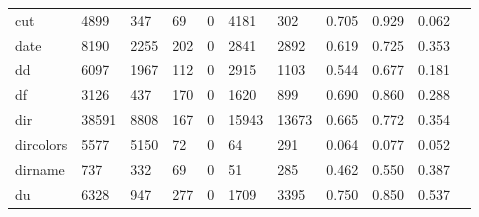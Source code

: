 \begin{longtable}{lp{1.10cm}p{1.10cm}p{1.10cm}p{1.10cm}p{1.10cm}p{1.10cm}p{1.10cm}p{1.10cm}p{1.10cm}p{1.10cm}}
cut       &                   4899 &                                347 &                                69 &                                0 &                              4181 &                             302 &                          0.705 &                                 0.929 &                               0.062 \\
date      &                   8190 &                               2255 &                               202 &                                0 &                              2841 &                            2892 &                          0.619 &                                 0.725 &                               0.353 \\
dd        &                   6097 &                               1967 &                               112 &                                0 &                              2915 &                            1103 &                          0.544 &                                 0.677 &                               0.181 \\
df        &                   3126 &                                437 &                               170 &                                0 &                              1620 &                             899 &                          0.690 &                                 0.860 &                               0.288 \\
dir       &                  38591 &                               8808 &                               167 &                                0 &                             15943 &                           13673 &                          0.665 &                                 0.772 &                               0.354 \\
dircolors &                   5577 &                               5150 &                                72 &                                0 &                                64 &                             291 &                          0.064 &                                 0.077 &                               0.052 \\
dirname   &                    737 &                                332 &                                69 &                                0 &                                51 &                             285 &                          0.462 &                                 0.550 &                               0.387 \\
du        &                   6328 &                                947 &                               277 &                                0 &                              1709 &                            3395 &                          0.750 &                                 0.850 &                               0.537 \\

\end{longtable}
